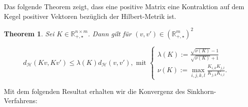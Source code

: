 \documentclass[twoside, 12pt,a4paper]{book}
\newtheorem{theorem}{Theorem}[subsection]
\numberwithin{equation}{section}
\begin{document}
	
	\noindent Das folgende Theorem zeigt, dass eine positive Matrix eine Kontraktion auf dem Kegel positiver Vektoren bezüglich der Hilbert-Metrik ist.
	
	\begin{theorem}\label{theorem41}
		Sei $K \in \mathbb{R}_{+,\star}^{n \times m}$. Dann gilt für $(v,v') \in (\mathbb{R}_{+, \star}^m)^2$
		
		\begin{equation}
		d_\mathcal{H}(Kv,Kv') \leq \lambda (K) d_\mathcal{H}(v,v'), \text{ mit } \begin{cases}
		\lambda (K) := \frac{\sqrt{\nu (K)} -1}{\sqrt{\nu (K)}+1}\\
		\nu (K) := \max_{i,j,k,l} \frac{K_{i,k}K_{j,l}}{K_{j,k}K_{i,l}}.
		
		\end{cases}
		\end{equation}
	\end{theorem}
	
	
	\noindent Mit dem folgenden Resultat erhalten wir die Konvergenz des Sinkhorn-Verfahrens:
	
\end{document}
